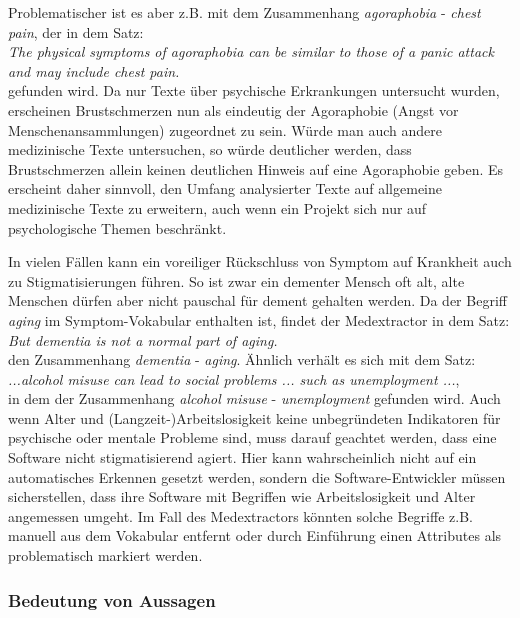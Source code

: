 Problematischer ist es aber z.B. mit dem Zusammenhang \emph{agoraphobia} - \emph{chest pain}, der in dem Satz:\\

\emph{\glqq The physical symptoms of agoraphobia can be similar to those of a panic attack and may include chest pain.\grqq}\\

gefunden wird. Da nur Texte über psychische Erkrankungen untersucht wurden, erscheinen Brustschmerzen nun als eindeutig der Agoraphobie (Angst vor Menschenansammlungen) zugeordnet zu sein. Würde man auch andere medizinische Texte untersuchen, so würde deutlicher werden, dass Brustschmerzen allein keinen deutlichen Hinweis auf eine Agoraphobie geben. Es erscheint daher sinnvoll, den Umfang analysierter Texte auf allgemeine medizinische Texte zu erweitern, auch wenn ein Projekt sich nur auf psychologische Themen beschränkt.

In vielen Fällen kann ein voreiliger Rückschluss von Symptom auf Krankheit auch zu Stigmatisierungen führen. So ist zwar ein dementer Mensch oft alt, alte Menschen dürfen aber nicht pauschal für dement gehalten werden. Da der Begriff \emph{aging} im Symptom-Vokabular enthalten ist, findet der Medextractor in dem Satz:\\

\emph{\glqq But dementia is not a normal part of aging.}\grqq\\

den Zusammenhang \emph{dementia} - \emph{aging}. Ähnlich verhält es sich mit dem Satz:\\

\emph{\glqq ...alcohol misuse can lead to social problems ... such as unemployment ...\grqq},\\

in dem der Zusammenhang \emph{alcohol misuse} - \emph{unemployment} gefunden wird. Auch wenn Alter und (Langzeit-)Arbeitslosigkeit keine unbegründeten Indikatoren für psychische oder mentale Probleme sind, muss darauf geachtet werden, dass eine Software nicht stigmatisierend agiert. Hier kann wahrscheinlich nicht auf ein automatisches Erkennen gesetzt werden, sondern die Software-Entwickler müssen sicherstellen, dass ihre Software mit Begriffen wie Arbeitslosigkeit und Alter angemessen umgeht. Im Fall des Medextractors könnten solche Begriffe z.B. manuell aus dem Vokabular entfernt oder durch Einführung einen Attributes als problematisch markiert werden.

\subsubsection{Bedeutung von Aussagen}
\label{subsec: bedeutung} 

